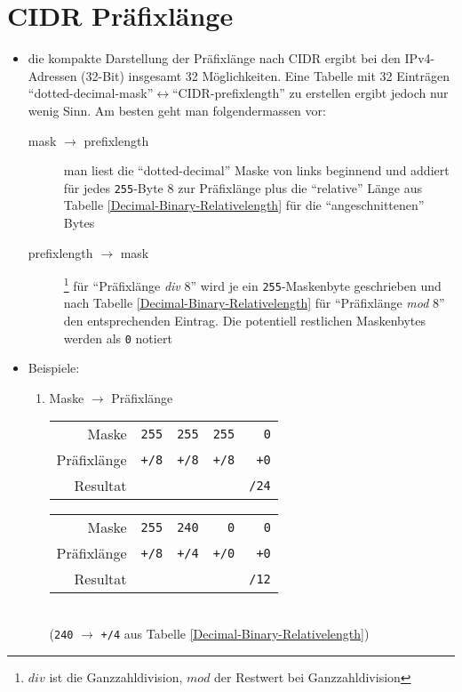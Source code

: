 \documentclass[a4paper,german]{scrartcl}
\begin{document}
\section{CIDR Pr\"afixl\"ange}
\begin{itemize}
  \item die kompakte Darstellung der Pr\"afixl\"ange nach CIDR ergibt bei den IPv4-Adressen (32-Bit) insgesamt 32 M\"oglichkeiten. Eine Tabelle mit 32 Eintr\"agen ``dotted-decimal-mask''$\leftrightarrow$``CIDR-prefixlength'' zu erstellen ergibt jedoch nur wenig Sinn. Am besten geht man folgendermassen vor:
    \begin{description}
      \item[mask $\rightarrow$ prefixlength] man liest die ``dotted-decimal'' Maske von links beginnend und addiert f\"ur jedes \texttt{255}-Byte 8 zur Pr\"afixl\"ange plus die ``relative'' L\"ange aus Tabelle \ref{Decimal-Binary-Relativelength} f\"ur die ``angeschnittenen'' Bytes
      \item[prefixlength $\rightarrow$ mask]\footnote{$div$ ist die Ganzzahldivision, $mod$ der Restwert bei Ganzzahldivision} f\"ur ``Pr\"afixl\"ange \emph{div} 8'' wird je ein \texttt{255}-Maskenbyte geschrieben und nach Tabelle \ref{Decimal-Binary-Relativelength} f\"ur ``Pr\"afixl\"ange \emph{mod} 8'' den entsprechenden Eintrag. Die potentiell restlichen Maskenbytes werden als \texttt{0} notiert
    \end{description}
    
    
  \item Beispiele:
    \begin{enumerate}
      \item Maske $\rightarrow$ Pr\"afixl\"ange
      \begin{center}
        \begin{tabular}{r|r r r r}
          Maske & \texttt{255} & \texttt{255} & \texttt{255} & \texttt{0} \\
          Pr\"afixl\"ange   & \texttt{+/8} & \texttt{+/8} & \texttt{+/8} & \texttt{+0} \\
          \hline
          Resultat & & & & \texttt{/24} \\
        \end{tabular}
      \end{center}
      \vspace{0.25cm}
      \begin{center}
        \begin{tabular}{r|r r r r}
          Maske & \texttt{255} & \texttt{240} & \texttt{0} & \texttt{0} \\
          Pr\"afixl\"ange   & \texttt{+/8} & \texttt{+/4} & \texttt{+/0} & \texttt{+0} \\
          \hline
          Resultat & & & & \texttt{/12} \\
        \end{tabular}\\
      (\texttt{240} $\rightarrow$ \texttt{+/4} aus Tabelle \ref{Decimal-Binary-Relativelength})
      \end{center}
      \vspace{0.25cm}


\end{enumerate}
\end{itemize}
\end{document}
